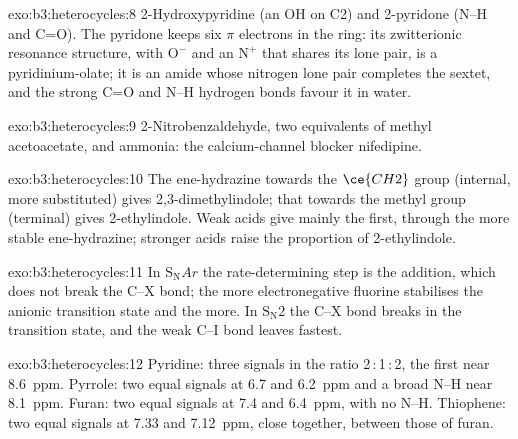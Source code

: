 \begin{solution}{exo:b3:heterocycles:8}
2-Hydroxypyridine (an OH on C2) and 2-pyridone (N--H and C=O). The pyridone keeps six
$\pi$ electrons in the ring: its zwitterionic resonance structure, with $\mathrm{O^-}$ and an
$\mathrm{N^+}$ that shares its lone pair, is a pyridinium-olate; it is an amide whose
nitrogen lone pair completes the sextet, and the strong C=O and N--H
hydrogen bonds favour it in water.
\end{solution}

\begin{solution}{exo:b3:heterocycles:9}
2-Nitrobenzaldehyde, two equivalents of methyl acetoacetate, and ammonia: the
calcium-channel blocker nifedipine.
\end{solution}

\begin{solution}{exo:b3:heterocycles:10}
The ene-hydrazine towards the $\ce{CH2}$ group (internal, more substituted) gives
2,3-dimethylindole; that towards the methyl group (terminal) gives 2-ethylindole.
Weak acids give mainly the first, through the more stable ene-hydrazine;
stronger acids raise the proportion of 2-ethylindole.
\end{solution}

\begin{solution}{exo:b3:heterocycles:11}
In $\mathrm S_\mathrm NAr$ the rate-determining step is the addition, which does not break the C--X
bond; the more electronegative fluorine stabilises the anionic transition state
and the  more. In $\mathrm S_\mathrm N2$ the C--X bond breaks in the
transition state, and the weak C--I bond leaves fastest.
\end{solution}

\begin{solution}{exo:b3:heterocycles:12}
Pyridine: three signals in the ratio 2\,:\,1\,:\,2, the first near \qty{8.6}{ppm}. Pyrrole: two equal
signals at 6.7 and \qty{6.2}{ppm} and a broad N--H near \qty{8.1}{ppm}. Furan: two equal signals at
7.4 and \qty{6.4}{ppm}, with no N--H. Thiophene: two equal signals at 7.33 and \qty{7.12}{ppm}, close
together, between those of furan.
\end{solution}

